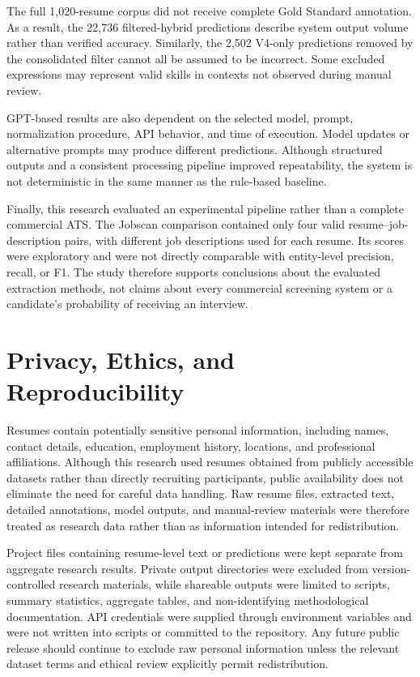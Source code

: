 \documentclass[conference]{IEEEtran}
\begin{document}
The full 1,020-resume corpus did not receive complete Gold Standard
annotation. As a result, the 22,736 filtered-hybrid predictions describe
system output volume rather than verified accuracy. Similarly, the 2,502
V4-only predictions removed by the consolidated filter cannot all be
assumed to be incorrect. Some excluded expressions may represent valid
skills in contexts not observed during manual review.

GPT-based results are also dependent on the selected model, prompt,
normalization procedure, API behavior, and time of execution. Model
updates or alternative prompts may produce different predictions.
Although structured outputs and a consistent processing pipeline improved
repeatability, the system is not deterministic in the same manner as the
rule-based baseline.

Finally, this research evaluated an experimental pipeline rather than a
complete commercial ATS. The Jobscan comparison contained only four valid
resume--job-description pairs, with different job descriptions used for
each resume. Its scores were exploratory and were not directly comparable
with entity-level precision, recall, or F1. The study therefore supports
conclusions about the evaluated extraction methods, not claims about every
commercial screening system or a candidate's probability of receiving an
interview.

\section{Privacy, Ethics, and Reproducibility}

Resumes contain potentially sensitive personal information, including
names, contact details, education, employment history, locations, and
professional affiliations. Although this research used resumes obtained
from publicly accessible datasets rather than directly recruiting
participants, public availability does not eliminate the need for careful
data handling. Raw resume files, extracted text, detailed annotations,
model outputs, and manual-review materials were therefore treated as
research data rather than as information intended for redistribution.

Project files containing resume-level text or predictions were kept
separate from aggregate research results. Private output directories were
excluded from version-controlled research materials, while shareable
outputs were limited to scripts, summary statistics, aggregate tables,
and non-identifying methodological documentation. API credentials were
supplied through environment variables and were not written into scripts
or committed to the repository. Any future public release should continue
to exclude raw personal information unless the relevant dataset terms and
ethical review explicitly permit redistribution.
\end{document}
